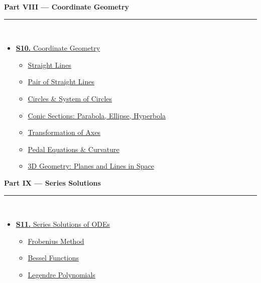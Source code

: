 \documentclass[12pt,a4paper]{article}
\begin{document}
\vspace{6pt}

\begin{tcolorbox}[breakable,colback=cH!5,colframe=cH,boxrule=1pt,arc=5pt,
  left=8pt,right=8pt,top=8pt,bottom=8pt,before skip=4pt]
  {\large\bfseries\textcolor{cH}{Part VIII --- Coordinate Geometry}}\\[5pt]
  \textcolor{cH!40}{\rule{\textwidth}{0.4pt}}\\[3pt]
  \small\begin{itemize}[leftmargin=1.2em,itemsep=1pt,label={\textcolor{cH}{$\triangleright$}}]
    \item \hyperref[sec:S10]{\textbf{S10.} Coordinate Geometry}
      \begin{itemize}[leftmargin=1.5em,itemsep=0pt,label={\textcolor{cH}{$\cdot$}}]
        \item \hyperref[sub:s10-lines]{Straight Lines}
        \item \hyperref[sub:s10-pairlines]{Pair of Straight Lines}
        \item \hyperref[sub:s10-circles]{Circles \& System of Circles}
        \item \hyperref[sub:s10-conics]{Conic Sections: Parabola, Ellipse, Hyperbola}
        \item \hyperref[sub:s10-transform]{Transformation of Axes}
        \item \hyperref[sub:s10-pedal]{Pedal Equations \& Curvature}
        \item \hyperref[sub:s10-3d]{3D Geometry: Planes and Lines in Space}
      \end{itemize}
  \end{itemize}
\end{tcolorbox}

\vspace{6pt}

\begin{tcolorbox}[breakable,colback=cI!5,colframe=cI,boxrule=1pt,arc=5pt,
  left=8pt,right=8pt,top=8pt,bottom=8pt,before skip=4pt]
  {\large\bfseries\textcolor{cI}{Part IX --- Series Solutions}}\\[5pt]
  \textcolor{cI!40}{\rule{\textwidth}{0.4pt}}\\[3pt]
  \small\begin{itemize}[leftmargin=1.2em,itemsep=1pt,label={\textcolor{cI}{$\triangleright$}}]
    \item \hyperref[sec:S11]{\textbf{S11.} Series Solutions of ODEs}
      \begin{itemize}[leftmargin=1.5em,itemsep=0pt,label={\textcolor{cI}{$\cdot$}}]
        \item \hyperref[sub:s11-frobenius]{Frobenius Method}
        \item \hyperref[sub:s11-bessel]{Bessel Functions}
        \item \hyperref[sub:s11-legendre]{Legendre Polynomials}
      \end{itemize}
  \end{itemize}
\end{tcolorbox}
\end{document}
